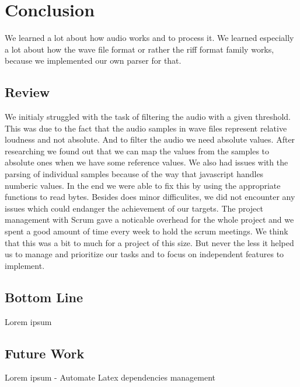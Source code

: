 \section{Conclusion}
We learned a lot about how audio works and to process it. We learned especially a lot about how the wave file format or rather the riff format family works, because we implemented our own parser for that. 

\subsection{Review}
We initialy struggled with the task of filtering the audio with a given threshold. This was due to the fact that the audio samples in wave files represent relative loudness and not absolute. And to filter the audio we need absolute values. After researching we found out that we can map the values from the samples to absolute ones when we have some reference values. 
We also had issues with the parsing of individual samples because of the way that javascript handles numberic values. In the end we were able to fix this by using the appropriate functions to read bytes. 
Besides does minor difficulites, we did not encounter any issues which could endanger the achievement of our targets. 
The project management with Scrum gave a noticable overhead for the whole project and we spent a good amount of time every week to hold the scrum meetings. We think that this was a bit to much for a project of this size. But never the less it helped us to manage and prioritize our tasks and to focus on independent features to implement. 

\subsection{Bottom Line}
Lorem ipsum

\subsection{Future Work}
Lorem ipsum
- Automate Latex dependencies management